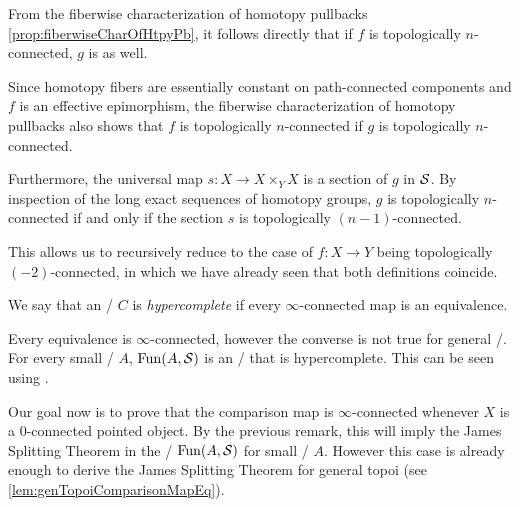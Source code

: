 \begin{remark}
\begin{itemize}
            From the fiberwise characterization of homotopy pullbacks \cref{prop:fiberwiseCharOfHtpyPb}, it follows directly that if $f$ is topologically $n$-connected, $g$ is as well.

            Since homotopy fibers are essentially constant on path-connected components and $f$ is an effective epimorphism, the fiberwise characterization of homotopy pullbacks also shows that $f$ is topologically $n$-connected if $g$ is topologically $n$-connected.

            Furthermore, the universal map $s\colon X\to X\times_{Y} X$ is a section of $g$ in $\mathcal{S}$.
            By inspection of the long exact sequences of homotopy groups, $g$ is topologically $n$-connected if and only if the section $s$ is topologically $(n-1)$-connected.

            This allows us to recursively reduce to the case of $f\colon X\to Y$ being topologically $(-2)$-connected, in which we have already seen that both definitions coincide.
    \end{itemize}
\end{remark}
\begin{definition}[Hypercompleteness]\label{def:hypercomplete}
    We say that an \inftytop/ $C$ is \emph{hypercomplete} if every $\infty$-connected map is an equivalence.
\end{definition}
\begin{remark}\label{rmk:spacesHypercomplete}
    Every equivalence is $\infty$-connected, however the converse is not true for general \inftytops/.
    For every small \inftycat/ $A$, $\operatorname{Fun}(A,\mathcal{S})$ is an \inftytop/ that is hypercomplete.
    This can be seen using \cite[Remark 6.5.4.7]{HTT}.
\end{remark}
Our goal now is to prove that the comparison map is $\infty$-connected whenever $X$ is a $0$-connected pointed object.
By the previous remark, this will imply the James Splitting Theorem in the \inftytops/ $\operatorname{Fun}(A,\mathcal{S})$ for small \inftycats/ $A$.
However this case is already enough to derive the James Splitting Theorem for general topoi (see \cref{lem:genTopoiComparisonMapEq}).


